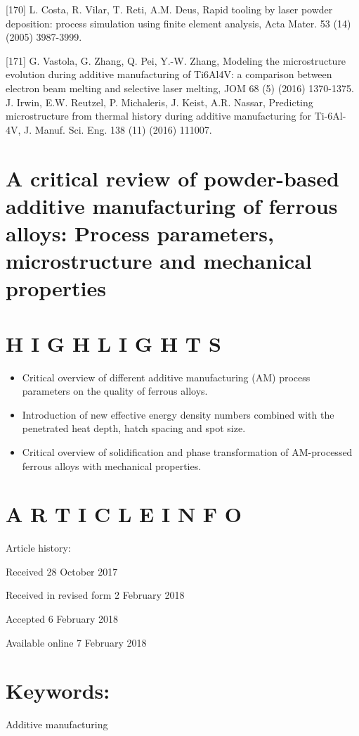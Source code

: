 \documentclass[10pt]{article}
\begin{document}
[170] L. Costa, R. Vilar, T. Reti, A.M. Deus, Rapid tooling by laser powder deposition: process simulation using finite element analysis, Acta Mater. 53 (14) (2005) 3987-3999.

[171] G. Vastola, G. Zhang, Q. Pei, Y.-W. Zhang, Modeling the microstructure evolution during additive manufacturing of Ti6Al4V: a comparison between electron beam melting and selective laser melting, JOM 68 (5) (2016) 1370-1375.\\
[172] J. Irwin, E.W. Reutzel, P. Michaleris, J. Keist, A.R. Nassar, Predicting microstructure from thermal history during additive manufacturing for Ti-6Al-4V, J. Manuf. Sci. Eng. 138 (11) (2016) 111007.

\section*{A critical review of powder-based additive manufacturing of ferrous alloys: Process parameters, microstructure and mechanical properties }


\section*{H I G H L I G H T S}
\begin{itemize}
  \item Critical overview of different additive manufacturing (AM) process parameters on the quality of ferrous alloys.

  \item Introduction of new effective energy density numbers combined with the penetrated heat depth, hatch spacing and spot size.

  \item Critical overview of solidification and phase transformation of AM-processed ferrous alloys with mechanical properties.

\end{itemize}

\section*{A R T I C L E I N F O}
Article history:

Received 28 October 2017

Received in revised form 2 February 2018

Accepted 6 February 2018

Available online 7 February 2018

\section*{Keywords:}
Additive manufacturing
\end{document}
